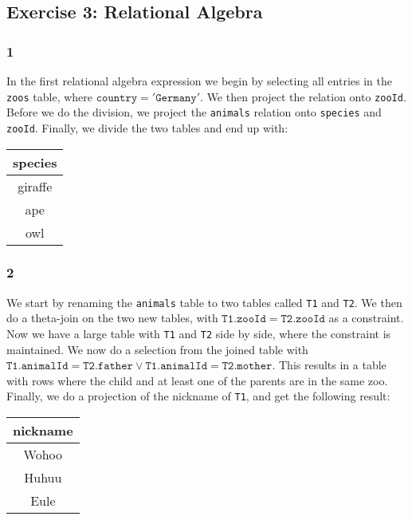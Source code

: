 \subsection{Exercise 3: Relational Algebra}


\subsubsection*{1}
In the first relational algebra expression we begin by selecting all entries in the \texttt{zoos} table, where $\mathtt{country} = \mathtt{'Germany'}$.
We then project the relation onto \texttt{zooId}.
Before we do the division, we project the \texttt{animals} relation onto \texttt{species} and \texttt{zooId}.
Finally, we divide the two tables and end up with:

\begin{center}
  \begin{tabular}{ c }
    \hline
    species \\  
    \hline
    giraffe \\
    ape \\
    owl \\
    \hline
  \end{tabular}
\end{center}

\subsubsection*{2}
We start by renaming the \texttt{animals} table to two tables called \texttt{T1} and \texttt{T2}.
We then do a theta-join on the two new tables, with $\mathtt{T1.zooId} = \mathtt{T2.zooId}$ as a constraint.
Now we have a large table with \texttt{T1} and \texttt{T2} side by side, where the constraint is maintained.
We now do a selection from the joined table with $\mathtt{T1.animalId} = \mathtt{T2.father} \vee \mathtt{T1.animalId} = \mathtt{T2.mother}$.
This results in a table with rows where the child and at least one of the parents are in the same zoo.
Finally, we do a projection of the nickname of \texttt{T1}, and get the following result:

\begin{center}
  \begin{tabular}{ c }
    \hline
    nickname \\  
    \hline
    Wohoo \\
    Huhuu \\
    Eule \\
    \hline
  \end{tabular}
\end{center}

